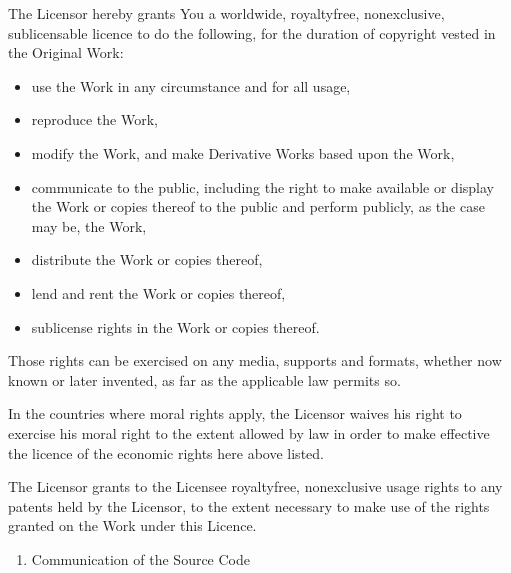 \documentclass[letterpaper,10pt,english]{sphinxmanual}
\begin{document}
\sphinxAtStartPar
The Licensor hereby grants You a worldwide, royalty\sphinxhyphen{}free, non\sphinxhyphen{}exclusive,
sublicensable licence to do the following, for the duration of copyright vested
in the Original Work:
\begin{itemize}
\item {} 
\sphinxAtStartPar
use the Work in any circumstance and for all usage,

\item {} 
\sphinxAtStartPar
reproduce the Work,

\item {} 
\sphinxAtStartPar
modify the Work, and make Derivative Works based upon the Work,

\item {} 
\sphinxAtStartPar
communicate to the public, including the right to make available or display
the Work or copies thereof to the public and perform publicly, as the case may
be, the Work,

\item {} 
\sphinxAtStartPar
distribute the Work or copies thereof,

\item {} 
\sphinxAtStartPar
lend and rent the Work or copies thereof,

\item {} 
\sphinxAtStartPar
sublicense rights in the Work or copies thereof.

\end{itemize}

\sphinxAtStartPar
Those rights can be exercised on any media, supports and formats, whether now
known or later invented, as far as the applicable law permits so.

\sphinxAtStartPar
In the countries where moral rights apply, the Licensor waives his right to
exercise his moral right to the extent allowed by law in order to make effective
the licence of the economic rights here above listed.

\sphinxAtStartPar
The Licensor grants to the Licensee royalty\sphinxhyphen{}free, non\sphinxhyphen{}exclusive usage rights to
any patents held by the Licensor, to the extent necessary to make use of the
rights granted on the Work under this Licence.
\begin{enumerate}
%
\setcounter{enumi}{2}
\item {} 
\sphinxAtStartPar
Communication of the Source Code

\end{enumerate}
\end{document}
